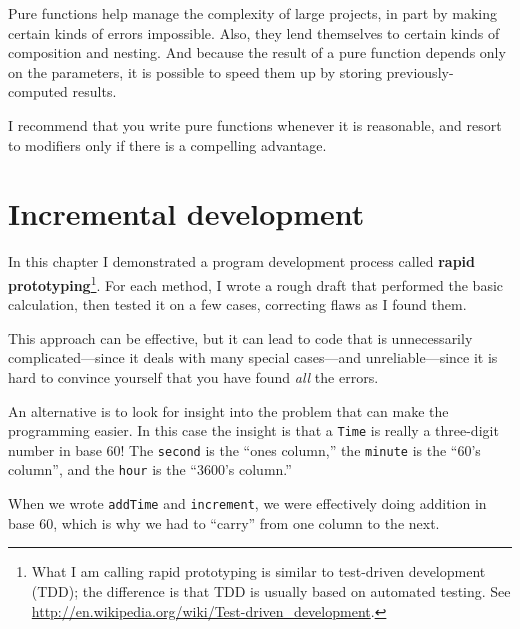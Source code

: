 Pure functions help manage the complexity of large projects, in part by making certain kinds of errors impossible.
Also, they lend themselves to certain kinds of composition and nesting.
And because the result of a pure function depends only on the parameters, it is possible to speed them up by storing previously-computed results.


I recommend that you write pure functions whenever it is reasonable, and resort to modifiers only if there is a compelling advantage.



\section{Incremental development}


In this chapter I demonstrated a program development process called
{\bf rapid prototyping}\footnote{What I am calling rapid prototyping
  is similar to test-driven development (TDD); the difference is that
  TDD is usually based on automated testing.  See
  \url{http://en.wikipedia.org/wiki/Test-driven_development}.}.  For
each method, I wrote a rough draft that performed the
basic calculation, then tested it on a few cases, correcting flaws
as I found them.

This approach can be effective, but it can lead to code
that is unnecessarily complicated---since it deals with many
special cases---and unreliable---since it is hard to convince
yourself that you have found {\em all} the errors.

An alternative is to look for insight
into the problem that can make the programming easier.  In
this case the insight is that a {\tt Time} is really a three-digit
number in base 60!  The {\tt second} is the ``ones column,''
the {\tt minute} is the ``60's column'', and the {\tt hour}
is the ``3600's column.''

When we wrote {\tt addTime} and {\tt increment}, we were effectively
doing addition in base 60, which is why we had to ``carry'' from one
column to the next.



